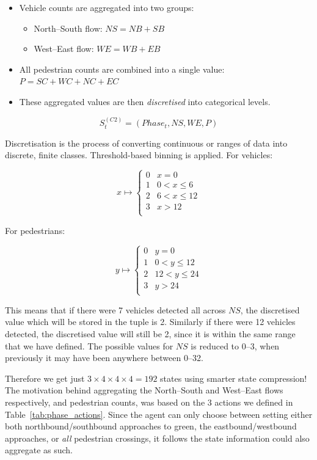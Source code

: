 \documentclass[a4paper]{report}
\begin{document}
\begin{itemize}
  \item Vehicle counts are aggregated into two groups:
    \begin{itemize}
      \item North--South flow: $NS = NB + SB$
      \item West--East flow: $WE = WB + EB$
    \end{itemize}
  \item All pedestrian counts are combined into a single value: $P = SC + WC + NC + EC$
  \item These aggregated values are then \emph{discretised} into categorical levels.
\end{itemize}

\begin{equation}
  S_t^{(C2)} = (Phase_t, NS, WE, P)
\end{equation}

Discretisation is the process of converting continuous or ranges of data into discrete, finite classes. Threshold-based binning is applied. For vehicles:

\[
x \mapsto
\begin{cases}
0 & \text{$x=0$} \\
1 & \text{$0<x\leq6$} \\
2 & \text{$6<x\leq12$} \\
3 & \text{$x>12$} \\
\end{cases}
\]

For pedestrians:

\[
y \mapsto
\begin{cases}
0 & \text{$y=0$} \\
1 & \text{$0<y\leq12$} \\
2 & \text{$12<y\leq24$} \\
3 & \text{$y>24$} \\
\end{cases}
\]

This means that if there were 7 vehicles detected all across $NS$, the discretised value which will be stored in the tuple is 2. Similarly if there were 12 vehicles detected, the discretised value will still be 2, since it is within the same range that we have defined. The possible values for $NS$ is reduced to 0--3, when previously it may have been anywhere between 0--32.

Therefore we get just $3\times4\times4\times4=192$ states using smarter state compression! The motivation behind aggregating the North--South and West--East flows respectively, and pedestrian counts, was based on the 3 actions we defined in Table~\ref{tab:phase_actions}. Since the agent can only choose between setting either both northbound/southbound approaches to green, the eastbound/westbound approaches, or \emph{all} pedestrian crossings, it follows the state information could also aggregate as such. 
\end{document}
